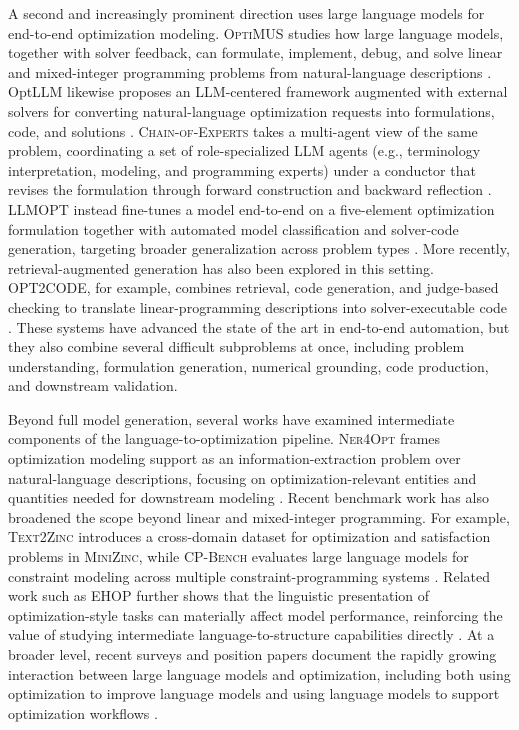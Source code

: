 \documentclass[pdflatex,sn-basic,Numbered]{sn-jnl}
\begin{document}
A second and increasingly prominent direction uses large language models for end-to-end optimization modeling. \textsc{OptiMUS} studies how large language models, together with solver feedback, can formulate, implement, debug, and solve linear and mixed-integer programming problems from natural-language descriptions \cite{ahmaditeshnizi2024optimus_icml,ahmaditeshnizi2024optimus03}. OptLLM likewise proposes an LLM-centered framework augmented with external solvers for converting natural-language optimization requests into formulations, code, and solutions \cite{zhang2024optllm}. \textsc{Chain-of-Experts} takes a multi-agent view of the same problem, coordinating a set of role-specialized LLM agents (e.g., terminology interpretation, modeling, and programming experts) under a conductor that revises the formulation through forward construction and backward reflection \cite{xiao2024chainofexperts}. \textsc{LLMOPT} instead fine-tunes a model end-to-end on a five-element optimization formulation together with automated model classification and solver-code generation, targeting broader generalization across problem types \cite{jiang2025llmopt}. More recently, retrieval-augmented generation has also been explored in this setting. \textsc{OPT2CODE}, for example, combines retrieval, code generation, and judge-based checking to translate linear-programming descriptions into solver-executable code \cite{ahmed2025opt2code}. These systems have advanced the state of the art in end-to-end automation, but they also combine several difficult subproblems at once, including problem understanding, formulation generation, numerical grounding, code production, and downstream validation.

Beyond full model generation, several works have examined intermediate components of the language-to-optimization pipeline. \textsc{Ner4Opt} frames optimization modeling support as an information-extraction problem over natural-language descriptions, focusing on optimization-relevant entities and quantities needed for downstream modeling \cite{kadioglu2024ner4opt}. Recent benchmark work has also broadened the scope beyond linear and mixed-integer programming. For example, \textsc{Text2Zinc} introduces a cross-domain dataset for optimization and satisfaction problems in \textsc{MiniZinc}, while \textsc{CP-Bench} evaluates large language models for constraint modeling across multiple constraint-programming systems \cite{singirikonda2025text2zinc,michailidis2025cpbench}. Related work such as \textsc{EHOP} further shows that the linguistic presentation of optimization-style tasks can materially affect model performance, reinforcing the value of studying intermediate language-to-structure capabilities directly \cite{duchnowski2025ehop}. At a broader level, recent surveys and position papers document the rapidly growing interaction between large language models and optimization, including both using optimization to improve language models and using language models to support optimization workflows \cite{huang2024llmoptimization,huang2025llmsmathmodeling,xiao2025optmodelingsurvey}.
\end{document}
